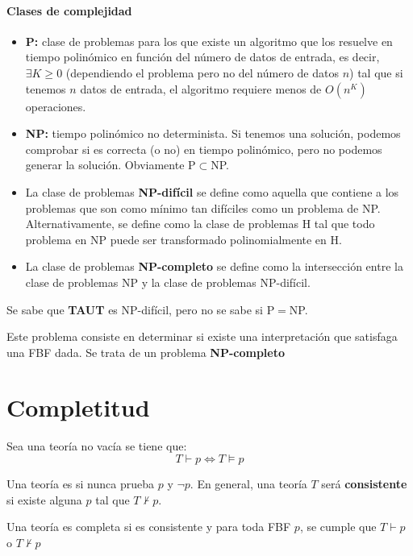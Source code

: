 \documentclass{apuntes}
\begin{document}
\paragraph{Clases de complejidad}
\begin{itemize}
	\item \textbf{P:} clase de problemas para los que existe un algoritmo que los resuelve en tiempo polinómico en función del número de datos de entrada, es decir, $\exists K\ge 0$ (dependiendo el problema pero no del número de datos $n$) tal que si tenemos $n$ datos de entrada, el algoritmo requiere menos de $O(n^K)$ operaciones.
	\item \textbf{NP:} tiempo polinómico no determinista. Si tenemos una solución, podemos comprobar si es correcta (o no) en tiempo polinómico, pero no podemos generar la solución. Obviamente P$\subset$NP.
	\item La clase de problemas \textbf{NP-difícil} se define como aquella que contiene a los problemas que son como mínimo tan difíciles como un problema de NP. Alternativamente, se define como la clase de problemas H tal que todo problema en NP puede ser transformado polinomialmente en H.
	\item La clase de problemas \textbf{NP-completo} se define como la intersección entre la clase de problemas NP y la clase de problemas NP-difícil.
\end{itemize}
Se sabe que \textbf{TAUT} es NP-difícil, pero no se sabe si P$=$NP.

\begin{defn}
Este problema consiste en determinar si existe una interpretación que satisfaga una FBF dada. Se trata de un problema \textbf{NP-completo}
\end{defn}

\section{Completitud}
\begin{theorem}
Sea una teoría no vacía se tiene que:
\[T \vdash p \iff T \vDash p\]
\end{theorem}

Una teoría es  si nunca prueba $p$ y $\neg p$. En general, una teoría $T$ será \textbf{consistente} si existe alguna $p$ tal que $T \nvdash p$. 

\begin{defn}
Una teoría es completa si es consistente y para toda FBF $p$, se cumple que $T \vdash p$ o $T \nvdash p$
\end{defn}
\end{document}
